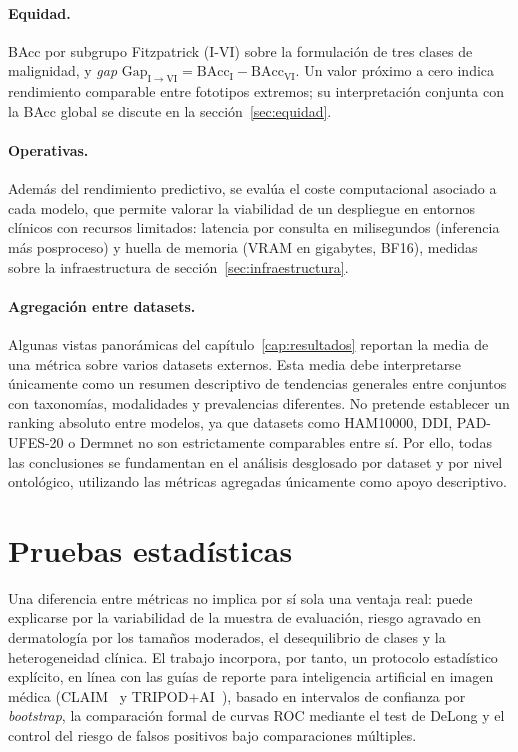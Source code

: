 \paragraph{Equidad.}
BAcc por subgrupo Fitzpatrick (I-VI) sobre la formulación de tres
clases de malignidad, y \emph{gap}
$\mathrm{Gap}_{\mathrm{I}\to\mathrm{VI}}
= \mathrm{BAcc}_{\mathrm{I}} - \mathrm{BAcc}_{\mathrm{VI}}$. Un
valor próximo a cero indica rendimiento comparable entre fototipos
extremos; su interpretación conjunta con la BAcc global se discute en
la sección~\ref{sec:equidad}.

\paragraph{Operativas.}
Además del rendimiento predictivo, se evalúa el coste computacional
asociado a cada modelo, que permite valorar la viabilidad de un
despliegue en entornos clínicos con recursos limitados: latencia por
consulta en milisegundos (inferencia más posproceso) y huella de
memoria (VRAM en gigabytes, BF16), medidas sobre la infraestructura
de sección~\ref{sec:infraestructura}.

\paragraph{Agregación entre datasets.}
\label{sec:agregacion-datasets}
Algunas vistas panorámicas del capítulo~\ref{cap:resultados} reportan
la media de una métrica sobre varios datasets externos. Esta media
debe interpretarse únicamente como un resumen descriptivo de
tendencias generales entre conjuntos con taxonomías, modalidades y
prevalencias diferentes. No pretende establecer un ranking absoluto
entre modelos, ya que datasets como HAM10000, DDI, PAD-UFES-20 o
Dermnet no son estrictamente comparables entre sí. Por ello, todas las
conclusiones se fundamentan en el análisis desglosado por dataset y
por nivel ontológico, utilizando las métricas agregadas únicamente
como apoyo descriptivo.

\section{Pruebas estadísticas}
\label{sec:estadistica}

Una diferencia entre métricas no implica por sí sola una ventaja
real: puede explicarse por la variabilidad de la muestra de
evaluación, riesgo agravado en dermatología por los tamaños
moderados, el desequilibrio de clases y la heterogeneidad clínica.
El trabajo incorpora, por tanto, un protocolo estadístico explícito,
en línea con las guías de reporte para inteligencia artificial en
imagen médica (CLAIM~\cite{claim2024} y TRIPOD+AI~\cite{tripodai2024}),
basado en intervalos de confianza por \emph{bootstrap}, la
comparación formal de curvas ROC mediante el test de DeLong y el
control del riesgo de falsos positivos bajo comparaciones múltiples.

